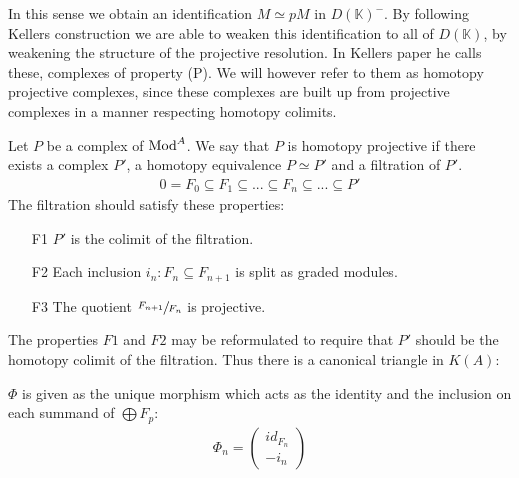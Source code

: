 \documentclass[../thesis.tex]{subfiles}
\begin{document}
            In this sense we obtain an identification $M \simeq pM$ in $D(\mathbb{K})^-$. By following Kellers construction we are able to weaken this identification to all of $D(\mathbb{K})$, by weakening the structure of the projective resolution. In Kellers paper he calls these, complexes of property (P). We will however refer to them as homotopy projective complexes, since these complexes are built up from projective complexes in a manner respecting homotopy colimits.

            \begin{definition}
                Let $P$ be a complex of $\tt{Mod}^A$. We say that $P$ is homotopy projective if there exists a complex $P'$, a homotopy equivalence $P \simeq P'$ and a filtration of $P'$.
                \begin{align*}
                    0 = F_0 \subseteq F_1 \subseteq ... \subseteq F_n \subseteq ... \subseteq P'
                \end{align*}
                The filtration should satisfy these properties:
                \begin{itemize}
                    \item[F1] $P'$ is the colimit of the filtration.
                    \item[F2] Each inclusion $i_n : F_n \subseteq F_{n+1}$ is split as graded modules.
                    \item[F3] The quotient $\sfrac{F_{n+1}}{F_n}$ is projective.
                \end{itemize}
            \end{definition}

            \begin{remark}
                The properties $F1$ and $F2$ may be reformulated to require that $P'$ should be the homotopy colimit of the filtration. Thus there is a canonical triangle in $K(A)$:
                \begin{center}
                \end{center}
                $\Phi$ is given as the unique morphism which acts as the identity and the inclusion on each summand of $\bigoplus F_p$:
                \begin{align*}
                    \Phi_n = \begin{pmatrix}
                        id_{F_n} \\ -i_n
                    \end{pmatrix}
                \end{align*}
            \end{remark}
\end{document}
